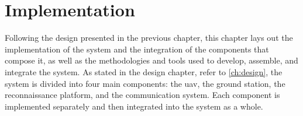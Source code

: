 \chapter{Implementation}\label{ch:implementation}

Following the design presented in the previous chapter, this chapter lays out the implementation of the system and the integration of the components that compose it, as well as the methodologies and tools used to develop, assemble, and integrate the system. As stated in the design chapter, refer to \cref{ch:design}, the system is divided into four main components: the \gls{uav}, the ground station, the reconnaissance platform, and the communication system. Each component is implemented separately and then integrated into the system as a whole.






